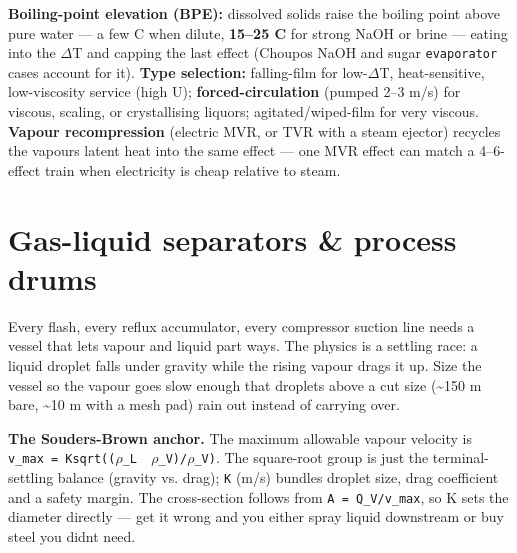 \documentclass[11pt,a4paper]{article}
\begin{document}
\textbf{Boiling-point elevation (BPE):} dissolved solids raise the
boiling point above pure water --- a few \textdegree{}C when dilute, \textbf{15--25
\textdegree{}C} for strong NaOH or brine --- eating into the \(\Delta\)T and capping the last
effect (Choupo\textquotesingle s NaOH and sugar \texttt{evaporator}
cases account for it). \textbf{Type selection:} falling-film for low-\(\Delta\)T,
heat-sensitive, low-viscosity service (high U);
\textbf{forced-circulation} (pumped 2--3 m/s) for viscous, scaling, or
crystallising liquors; agitated/wiped-film for very viscous.
\textbf{Vapour recompression} (electric MVR, or TVR with a steam
ejector) recycles the vapour\textquotesingle s latent heat into the same
effect --- one MVR effect can match a 4--6-effect train when electricity
is cheap relative to steam.

\hypertarget{gas-liquid-separators--process-drums}{%
\section{Gas-liquid separators \& process
drums}\label{gas-liquid-separators--process-drums}}

Every flash, every reflux accumulator, every compressor suction line
needs a vessel that lets vapour and liquid part ways. The physics is a
settling race: a liquid droplet falls under gravity while the rising
vapour drags it up. Size the vessel so the vapour goes slow enough that
droplets above a cut size (\textasciitilde150 \textmu{}m bare, \textasciitilde10
\textmu{}m with a mesh pad) rain out instead of carrying over.

\textbf{The Souders-Brown anchor.} The maximum allowable vapour velocity
is \texttt{v\_max\ =\ K\textperiodcentered{}sqrt((\(\rho\)\_L\ \textminus{}\ \(\rho\)\_V)/\(\rho\)\_V)}. The square-root
group is just the terminal-settling balance (gravity vs. drag);
\texttt{K} (m/s) bundles droplet size, drag coefficient and a safety
margin. The cross-section follows from \texttt{A\ =\ Q\_V/v\_max}, so K
sets the diameter directly --- get it wrong and you either spray liquid
downstream or buy steel you didn\textquotesingle t need.
\end{document}

